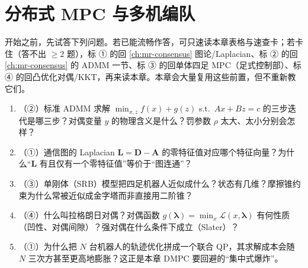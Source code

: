 \chapter{分布式 MPC 与多机编队}
\label{ch:mr-dmpc}


\providecommand{\argminop}{\operatorname*{arg\,min}}
\providecommand{\Real}{\operatorname{Re}}


\begin{practice}[前置自测]
开始之前，先试答下列问题。若已能流畅作答，可只速读本章表格与速查卡；若卡住（答不出 $\ge 2$ 题），标 ① 的回 \cref{ch:mr-consensus} 图论/Laplacian、标 ② 的回 \cref{ch:mr-consensus} 的 ADMM 一节、标 ③ 的回单体四足 MPC（足式控制部）、标 ④ 的回凸优化对偶/KKT，再来读本章。本章会大量复用这些前置，但不重新教它们。
\begin{enumerate}
  \item （②）标准 ADMM 求解 $\min_{x,z}f(x)+g(z)$ s.t.\ $Ax+Bz=c$ 的三步迭代是哪三步？对偶变量 $y$ 的物理含义是什么？罚参数 $\rho$ 太大、太小分别会怎样？
  \item （①）通信图的 Laplacian $\mathbf{L}=\mathbf{D}-\mathbf{A}$ 的零特征值对应哪个特征向量？为什么“$\mathbf{L}$ 有且仅有一个零特征值”等价于“图连通”？
  \item （③）单刚体（SRB）模型把四足机器人近似成什么？状态有几维？摩擦锥约束为什么常被近似成金字塔而非直接用二阶锥？
  \item （④）什么叫拉格朗日对偶？对偶函数 $g(\boldsymbol{\lambda})=\min_x\mathcal{L}(x,\boldsymbol{\lambda})$ 有何性质（凹性、对偶间隙）？强对偶在什么条件下成立（Slater）？
  \item （①）为什么把 $N$ 台机器人的轨迹优化拼成一个联合 QP，其求解成本会随 $N$ 三次方甚至更高地膨胀？这正是本章 DMPC 要回避的“集中式爆炸”。
\end{enumerate}
\end{practice}

